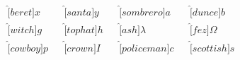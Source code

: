 \documentclass{article}
\begin{document}
\vspace*{-9mm}
\begin{align*}
\hat[beret]{x}&&
\hat[santa]{y}&&
\hat[sombrero]{a}&&
\hat[dunce]{b}\\
\hat[witch]{g}&&
\hat[tophat]{h}&&
\hat[ash]{\lambda}&&
\hat[fez]{\Omega}\\
\hat[cowboy]{p}&&
\hat[crown]{I}&&
\hat[policeman]{c}&&
\hat[scottish]{s}
\end{align*}
\end{document}
